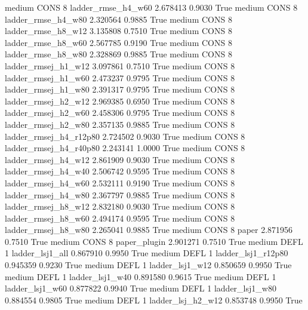     medium     CONS                 8     ladder_rmse_h4_w60   2.678413      0.9030    True
    medium     CONS                 8     ladder_rmse_h4_w80   2.320564      0.9885    True
    medium     CONS                 8     ladder_rmse_h8_w12   3.135808      0.7510    True
    medium     CONS                 8     ladder_rmse_h8_w60   2.567785      0.9190    True
    medium     CONS                 8     ladder_rmse_h8_w80   2.328869      0.9885    True
    medium     CONS                 8    ladder_rmsej_h1_w12   3.097861      0.7510    True
    medium     CONS                 8    ladder_rmsej_h1_w60   2.473237      0.9795    True
    medium     CONS                 8    ladder_rmsej_h1_w80   2.391317      0.9795    True
    medium     CONS                 8    ladder_rmsej_h2_w12   2.969385      0.6950    True
    medium     CONS                 8    ladder_rmsej_h2_w60   2.458306      0.9795    True
    medium     CONS                 8    ladder_rmsej_h2_w80   2.357135      0.9885    True
    medium     CONS                 8 ladder_rmsej_h4_r12p80   2.724502      0.9030    True
    medium     CONS                 8 ladder_rmsej_h4_r40p80   2.243141      1.0000    True
    medium     CONS                 8    ladder_rmsej_h4_w12   2.861909      0.9030    True
    medium     CONS                 8    ladder_rmsej_h4_w40   2.506742      0.9595    True
    medium     CONS                 8    ladder_rmsej_h4_w60   2.532111      0.9190    True
    medium     CONS                 8    ladder_rmsej_h4_w80   2.367797      0.9885    True
    medium     CONS                 8    ladder_rmsej_h8_w12   2.832180      0.9030    True
    medium     CONS                 8    ladder_rmsej_h8_w60   2.494174      0.9595    True
    medium     CONS                 8    ladder_rmsej_h8_w80   2.265041      0.9885    True
    medium     CONS                 8                  paper   2.871956      0.7510    True
    medium     CONS                 8           paper_plugin   2.901271      0.7510    True
    medium     DEFL                 1        ladder_lsj1_all   0.867910      0.9950    True
    medium     DEFL                 1     ladder_lsj1_r12p80   0.945359      0.9230    True
    medium     DEFL                 1        ladder_lsj1_w12   0.850659      0.9950    True
    medium     DEFL                 1        ladder_lsj1_w40   0.891580      0.9615    True
    medium     DEFL                 1        ladder_lsj1_w60   0.877822      0.9940    True
    medium     DEFL                 1        ladder_lsj1_w80   0.884554      0.9805    True
    medium     DEFL                 1      ladder_lsj_h2_w12   0.853748      0.9950    True
